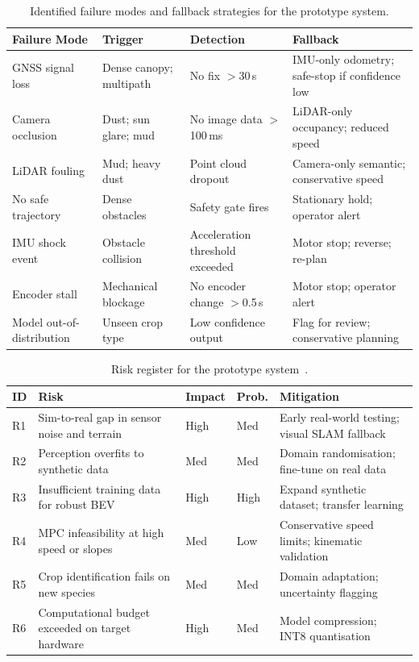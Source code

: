 \documentclass[12pt, a4paper]{article}
\begin{document}
\begin{table}[htbp]
\centering
\caption{Identified failure modes and fallback strategies for the prototype system.}
\label{tab:failure_modes}
\begin{tabularx}{\textwidth}{X X X X}
\toprule
\textbf{Failure Mode} & \textbf{Trigger} & \textbf{Detection} & \textbf{Fallback} \\
\midrule
GNSS signal loss & Dense canopy; multipath & No fix $>$30\,s & IMU-only odometry; safe-stop if confidence low \cite{ref2} \\
\addlinespace
Camera occlusion & Dust; sun glare; mud & No image data $>$100\,ms & LiDAR-only occupancy; reduced speed \\
\addlinespace
LiDAR fouling & Mud; heavy dust & Point cloud dropout & Camera-only semantic; conservative speed \\
\addlinespace
No safe trajectory & Dense obstacles & Safety gate fires & Stationary hold; operator alert \cite{ref234} \\
\addlinespace
IMU shock event & Obstacle collision & Acceleration threshold exceeded & Motor stop; reverse; re-plan \\
\addlinespace
Encoder stall & Mechanical blockage & No encoder change $>$0.5\,s & Motor stop; operator alert \\
\addlinespace
Model out-of-distribution & Unseen crop type & Low confidence output & Flag for review; conservative planning \\
\bottomrule
\end{tabularx}
\end{table}

\begin{table}[htbp]
\centering
\caption{Risk register for the prototype system~\cite{ref1, ref2, ref233, ref234}.}
\label{tab:risks}
\begin{tabularx}{\textwidth}{l X l l X}
\toprule
\textbf{ID} & \textbf{Risk} & \textbf{Impact} & \textbf{Prob.} & \textbf{Mitigation} \\
\midrule
R1 & Sim-to-real gap in sensor noise and terrain & High & Med & Early real-world testing; visual SLAM fallback \\
\addlinespace
R2 & Perception overfits to synthetic data & Med & Med & Domain randomisation; fine-tune on real data \cite{ref2} \\
\addlinespace
R3 & Insufficient training data for robust BEV & High & High & Expand synthetic dataset; transfer learning \cite{ref233} \\
\addlinespace
R4 & MPC infeasibility at high speed or slopes & Med & Low & Conservative speed limits; kinematic validation \\
\addlinespace
R5 & Crop identification fails on new species & Med & Med & Domain adaptation; uncertainty flagging \cite{ref154} \\
\addlinespace
R6 & Computational budget exceeded on target hardware & High & Med & Model compression; INT8 quantisation \cite{ref68, ref71} \\
\bottomrule
\end{tabularx}
\end{table}
\end{document}
